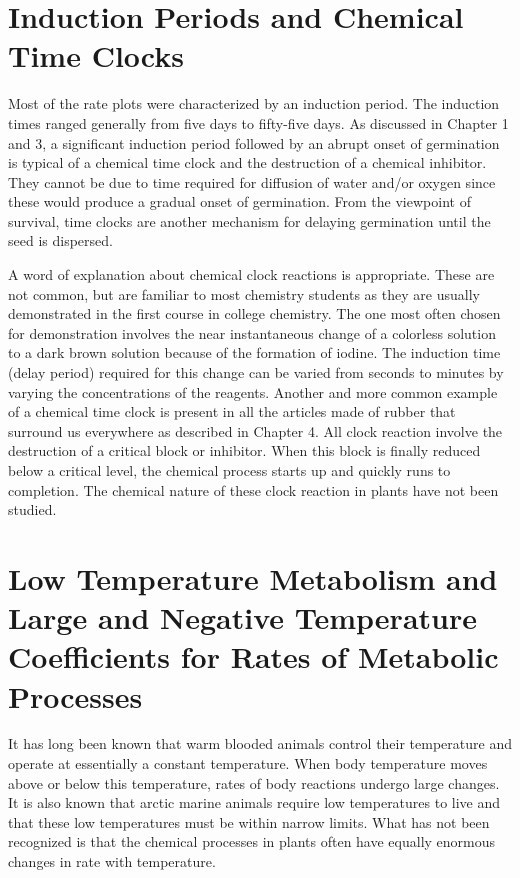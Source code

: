 \section[Chemical Time Clocks]{Induction Periods and Chemical Time Clocks}

Most of the rate plots were characterized by an induction period. The induction
times ranged generally from five days to fifty-five days. As discussed in Chapter 1 and
3, a significant induction period followed by an abrupt onset of germination is typical of
a chemical time clock and the destruction of a chemical inhibitor. They cannot be due
to time required for diffusion of water and/or oxygen since these would produce a
gradual onset of germination. From the viewpoint of survival, time clocks are another
mechanism for delaying germination until the seed is dispersed.

A word of explanation about chemical clock reactions is appropriate. These are
not common, but are familiar to most chemistry students as they are usually
demonstrated in the first course in college chemistry. The one most often chosen for
demonstration involves the near instantaneous change of a colorless solution to a
dark brown solution because of the formation of iodine. The induction time (delay
period) required for this change can be varied from seconds to minutes by varying the
concentrations of the reagents. Another and more common example of a chemical
time clock is present in all the articles made of rubber that surround us everywhere as
described in Chapter 4. All clock reaction involve the destruction of a critical block or
inhibitor. When this block is finally reduced below a critical level, the chemical process
starts up and quickly runs to completion. The chemical nature of these clock reaction
in plants have not been studied.

\section[Low Temperature Metabolism]{Low Temperature Metabolism and Large and Negative Temperature
Coefficients for Rates of Metabolic Processes}

It has long been known that warm blooded animals control their temperature
and operate at essentially a constant temperature. When body temperature moves
above or below this temperature, rates of body reactions undergo large changes. It is
also known that arctic marine animals require low temperatures to live and that these
low temperatures must be within narrow limits. What has not been recognized is that
the chemical processes in plants often have equally enormous changes in rate with
temperature.

